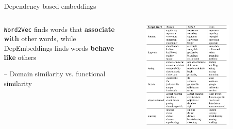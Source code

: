\documentclass[12pt]{beamer}
\begin{document}
\begin{frame}{Dependency-based embeddings}

\begin{columns}
	
\begin{column}{4cm}
\texttt{Word2Vec} finds words that \textbf{associate with} other words, while DepEmbeddings finds words \textbf{behave like} others

-- Domain similarity vs. functional similarity
\end{column}

\begin{column}{6cm}
\begin{figure}
	\includegraphics[width=\linewidth]{img/levy2015.png}
\end{figure}
	
\end{column}

\end{columns}
	
\end{frame}
\end{document}
